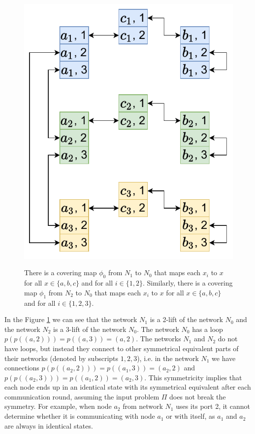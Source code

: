 \begin{figure}[H]
{    \includegraphics[scale=0.46]{diagrams/covering_map_5c2.pdf}
  }
  \caption{
    There is a covering map $\phi_0$ from $N_1$ to $N_0$ that maps each $x_i$ to $x$ for all $x \in \{a, b, c\}$ and for all $i \in \{1, 2\}$.
    Similarly, there is a covering map $\phi_1$ from $N_2$ to $N_0$ that maps each $x_i$ to $x$ for all $x \in \{a, b, c\}$ and for all $i \in \{1, 2, 3\}$.
  }
  \label{fig:covering_map3}
\end{figure}

In the Figure \ref{fig:covering_map3} we can see that the network $N_1$ is a 2-lift of the network $N_0$ and the network $N_2$ is a 3-lift of the network $N_0$.
The network $N_0$ has a loop $p(p((a, 2))) = p((a, 3)) = (a, 2)$.
The networks $N_1$ and $N_2$ do not have loops, but instead they connect to other symmetrical equivalent parts of their networks (denoted by subscripts \(1, 2, 3\)), i.e. in the network $N_1$ we have connections $p(p((a_2, 2))) = p((a_1, 3)) = (a_2, 2)$ and $p(p((a_2, 3))) = p((a_1, 2)) = (a_2, 3)$.
This symmetricity implies that each node ends up in an identical state with its symmetrical equivalent after each communication round, assuming the input problem $\Pi$ does not break the symmetry.
For example, when node $a_2$ from network $N_1$ uses its port 2, it cannot determine whether it is communicating with node $a_1$ or with itself, as $a_1$ and $a_2$ are always in identical states.

